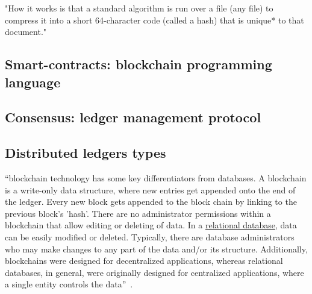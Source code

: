 "How it works is that a standard algorithm is run over a file (any file) to compress it into a short 64-character code (called a hash) that is unique*
to that document."~\cite{swan2015blockchain}


\subsection{Smart-contracts: blockchain programming language~\label{ssec:smart-contract}}



\subsection{Consensus: ledger management protocol~\label{ssec:consensus}}



\subsection{Distributed ledgers types}

``blockchain technology has some key differentiators from databases.
A blockchain is a write-only data structure, where new entries get appended onto the end of the ledger. Every new block gets appended to the block chain by linking to the previous block's 'hash'.
There are no administrator permissions within a blockchain that allow editing or deleting of data.
In a \href{https://en.wikipedia.org/wiki/Relational_database}{relational database}, data can be easily modified or deleted. Typically, there are database administrators who may make changes to any part of the data and/or its structure. Additionally, blockchains were designed for decentralized applications, whereas relational databases, in general, were originally designed for centralized applications, where a single entity controls the data''~\cite{LFS171x}.

